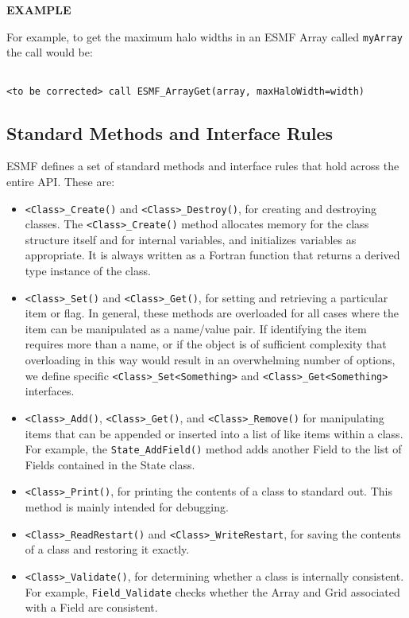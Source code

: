 {\bf EXAMPLE}

For example, to get the maximum halo widths in an ESMF Array called
{\tt myArray} the call would be:

\begin{verbatim}

<to be corrected> call ESMF_ArrayGet(array, maxHaloWidth=width)

\end{verbatim}

\subsection{Standard Methods and Interface Rules}

ESMF defines a set of standard methods and interface rules that
hold across the entire API.  These are: 

\begin{itemize}

\item {\tt <Class>\_Create()} and {\tt <Class>\_Destroy()}, for creating and 
destroying classes.  The {\tt <Class>\_Create()} method allocates memory 
for the class structure itself and for internal variables, and
initializes variables as appropriate.  It is always written as a 
Fortran function that returns a derived type instance of the class.

\item {\tt <Class>\_Set()} and {\tt <Class>\_Get()}, for setting and 
retrieving a particular item or flag.  In general, these methods are
overloaded for all cases where the item can be manipulated as a
name/value pair.  If identifying the item requires more than a 
name, or if the object is of sufficient complexity that overloading
in this way would result in an overwhelming number of options, we 
define specific {\tt <Class>\_Set<Something>} and 
{\tt <Class>\_Get<Something>} interfaces.

\item {\tt <Class>\_Add()}, {\tt <Class>\_Get()}, and 
{\tt <Class>\_Remove()} for manipulating 
items that can be appended or inserted into a list of like
items within a class.  For example, the {\tt State\_AddField()}
method adds another Field to the list of Fields contained
in the State class.

\item {\tt <Class>\_Print()}, for printing the contents of a class to 
standard out.  This method is mainly intended for debugging.

\item {\tt <Class>\_ReadRestart()} and {\tt <Class>\_WriteRestart}, 
for saving the contents of a class and restoring it exactly.

\item {\tt <Class>\_Validate()}, for determining whether a class is 
internally consistent.  For example, {\tt Field\_Validate} checks 
whether the Array and Grid associated with a Field are consistent.

\end{itemize}

